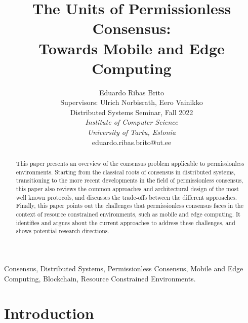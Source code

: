 \documentclass[journal]{IEEEtran}
\begin{document}
\title{The Units of Permissionless Consensus: \\ Towards Mobile and Edge Computing}

\author{Eduardo Ribas Brito 
\\Supervisors: Ulrich Norbisrath, Eero Vainikko
\\Distributed Systems Seminar, Fall 2022
\\\emph{Institute of Computer Science}
\\\emph{University of Tartu, Estonia}
\\ eduardo.ribas.brito@ut.ee}

\maketitle

\begin{abstract}

This paper presents an overview of the consensus problem
applicable to permissionless environments. Starting from 
the classical roots of consensus in distributed systems,
transitioning to the more recent developments in the
field of permissionless consensus, this paper also reviews
the common approaches and architectural design of the most well known protocols, 
and discusses the trade-offs between the different approaches.
Finally, this paper points out the challenges that
permissionless consensus faces in the context of resource
constrained environments, such as mobile and edge computing.
It identifies and argues about the current approaches to address these challenges,
and shows potential research directions.

\end{abstract}

\begin{IEEEkeywords}
Consensus, Distributed Systems, Permissionless Consensus, Mobile and Edge Computing, Blockchain, Resource Constrained Environments.
\end{IEEEkeywords}

\section{Introduction}
\end{document}
